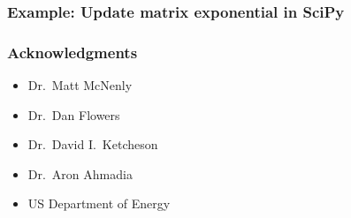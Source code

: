 \documentclass [14pt]{beamer}
\begin{document}
\begin{frame}
\frametitle{Example: Update matrix exponential in SciPy}
\end{frame}

\begin{frame}
\frametitle{Acknowledgments}
\begin{itemize}
\item Dr.~Matt McNenly
\item Dr.~Dan Flowers
\item Dr.~David I.~Ketcheson
\item Dr.~Aron Ahmadia
\item US Department of Energy
\end{itemize}
\end{frame}

\begin{frame}
\end{frame}
\end{document}
